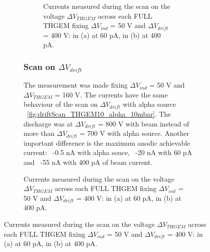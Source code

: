 \documentclass[a4paper, 11 pt]{article}
\newcommand{\Vind}{$\Delta V_{ind}$}
\newcommand{\Vthgem}{$\Delta V_{THGEM}$}
\newcommand{\Vdrift}{$ \Delta V_{drift}$}
\begin{document}
\begin{figure}[htbp]
\begin{figure}[htbp]
\begin{figure}[!htb]
	\centering
	\caption{Currents measured during the scan on the voltage \Vthgem{} across each FULL THGEM fixing \Vind{} = 50 V and \Vdrift{} = 400 V: in (a) at 60 pA, in (b) at 400 pA.}
	\label{fig:thgemScan_THGEM10_beam_10mbar}
\end{figure}

\subsubsection{Scan on \Vdrift}

The measurement was made fixing \Vind{} = 50 V and \Vthgem{} = 160 V. The currents have the same behaviour of the scan on \Vdrift{} with alpha source ~\ref{fig:driftScan_THGEM10_alpha_10mbar}. The discharge was at \Vdrift{} = 800 V with beam instead of more than \Vdrift{} = 700 V with alpha source. Another important difference is the maximum anodic achievable current: ~-0.5 nA with alpha souce, ~-20 nA with 60 pA and ~-55 nA with 400 pA of beam current.


\end{figure}
\end{figure}
\end{document}
